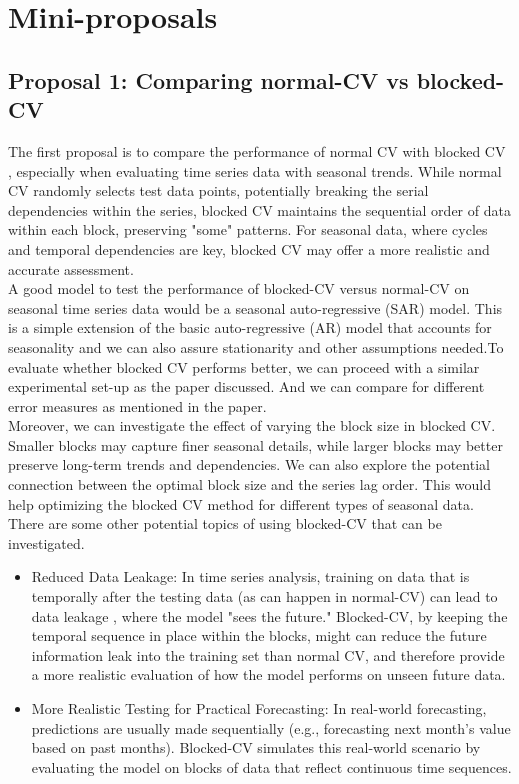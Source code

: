 \documentclass[12pt, oneside]{amsart}
\theoremstyle{definition}
\theoremstyle{remark}
\numberwithin{equation}{section}
\begin{document}
\section{Mini-proposals}

\subsection{Proposal 1: Comparing normal-CV vs blocked-CV} %
The first proposal is to compare the performance of normal CV with blocked CV \citep{Bergmeir2014}, especially when evaluating time series data with seasonal trends. While normal CV randomly selects test data points, potentially breaking the serial dependencies within the series, blocked CV maintains the sequential order of data within each block, preserving "some" patterns. For seasonal data, where cycles and temporal dependencies are key, blocked CV may offer a more realistic and accurate assessment.\\

A good model to test the performance of blocked-CV versus normal-CV on seasonal time series data would be a seasonal auto-regressive (SAR) model. This is a simple extension of the basic auto-regressive (AR) model that accounts for seasonality and we can also assure stationarity and other assumptions needed.To evaluate whether blocked CV performs better, we can proceed with a similar experimental set-up as the paper discussed. And we can compare for different error measures as mentioned in the paper. \\

Moreover, we can investigate the effect of varying the block size in blocked CV. Smaller blocks may capture finer seasonal details, while larger blocks may better preserve long-term trends and dependencies. We can also explore the potential connection between the optimal block size and the series lag order. This would help optimizing the blocked CV method for different types of seasonal data. There are some other potential topics of using blocked-CV that can be investigated.
\begin{itemize}
    \item Reduced Data Leakage: In time series analysis, training on data that is temporally after the testing data (as can happen in normal-CV) can lead to data leakage \citep{Shao}, where the model "sees the future." Blocked-CV, by keeping the temporal sequence in place within the blocks, might can reduce the future information leak into the training set than normal CV, and therefore provide a more realistic evaluation of how the model performs on unseen future data.
    \item More Realistic Testing for Practical Forecasting: In real-world forecasting, predictions are usually made sequentially (e.g., forecasting next month's value based on past months). Blocked-CV simulates this real-world scenario by evaluating the model on blocks of data that reflect continuous time sequences. 


\end{itemize}
\end{document}
